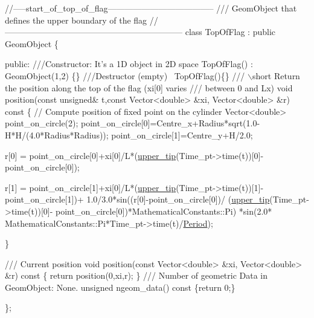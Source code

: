 \begin{DoxyCodeInclude}





\textcolor{comment}{//-----start\_of\_top\_of\_flag--------------------------------------}\textcolor{comment}{}
\textcolor{comment}{/// GeomObject that defines the upper boundary of the flag}
\textcolor{comment}{}\textcolor{comment}{//---------------------------------------------------------------}
 \textcolor{keyword}{class }TopOfFlag : \textcolor{keyword}{public} GeomObject
 \{
  
 \textcolor{keyword}{public}:
  \textcolor{comment}{}
\textcolor{comment}{  ///Constructor: It's a 1D object in 2D space }
\textcolor{comment}{}  TopOfFlag() : GeomObject(1,2) \{\}
\textcolor{comment}{}
\textcolor{comment}{  ///Destructor (empty)}
\textcolor{comment}{}  ~TopOfFlag()\{\}
  \textcolor{comment}{}
\textcolor{comment}{  /// \(\backslash\)short Return the position along the top of the flag (xi[0] varies }
\textcolor{comment}{  /// between 0 and Lx)}
\textcolor{comment}{}  \textcolor{keywordtype}{void} position(\textcolor{keyword}{const} \textcolor{keywordtype}{unsigned}& t,\textcolor{keyword}{const} Vector<double> &xi, Vector<double> &r)\textcolor{keyword}{}
\textcolor{keyword}{   const}
\textcolor{keyword}{   }\{
    \textcolor{comment}{// Compute position of fixed point on the cylinder}
    Vector<double> point\_on\_circle(2);     
    point\_on\_circle[0]=Centre\_x+Radius*sqrt(1.0-H*H/(4.0*Radius*Radius));
    point\_on\_circle[1]=Centre\_y+H/2.0;

    r[0] = point\_on\_circle[0]+xi[0]/L*(\hyperlink{namespaceFlag__definition_a6af3444eee77be503be4aa8c2ef47c13}{upper\_tip}(Time\_pt->time(t))[0]-
                                        point\_on\_circle[0]);
    
    r[1] = point\_on\_circle[1]+xi[0]/L*(\hyperlink{namespaceFlag__definition_a6af3444eee77be503be4aa8c2ef47c13}{upper\_tip}(Time\_pt->time(t))[1]-
                                        point\_on\_circle[1])+
     1.0/3.0*sin((r[0]-point\_on\_circle[0])/
                 (\hyperlink{namespaceFlag__definition_a6af3444eee77be503be4aa8c2ef47c13}{upper\_tip}(Time\_pt->time(t))[0]-
                  point\_on\_circle[0])*MathematicalConstants::Pi)
     *sin(2.0* MathematicalConstants::Pi*Time\_pt->time(t)/\hyperlink{namespaceFlag__definition_a47976a19abd58b9c31671f074ca57285}{Period});
    
   \}
 
  \textcolor{comment}{}
\textcolor{comment}{  /// Current position}
\textcolor{comment}{}  \textcolor{keywordtype}{void} position(\textcolor{keyword}{const} Vector<double> &xi, Vector<double> &r)\textcolor{keyword}{ const}
\textcolor{keyword}{   }\{
    \textcolor{keywordflow}{return} position(0,xi,r);
   \}
\textcolor{comment}{}
\textcolor{comment}{  /// Number of geometric Data in GeomObject: None.}
\textcolor{comment}{}  \textcolor{keywordtype}{unsigned} ngeom\_data()\textcolor{keyword}{ const }\{\textcolor{keywordflow}{return} 0;\} 
  
\};

\end{DoxyCodeInclude}


